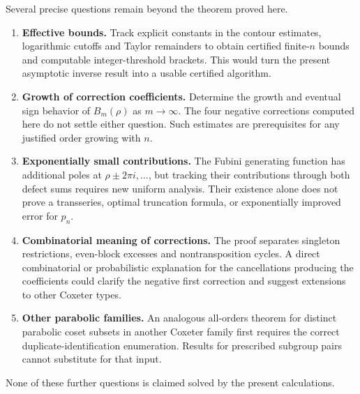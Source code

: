 \documentclass[11pt,letterpaper]{article}
\theoremstyle{remark}\newtheorem{remark}[theorem]{Remark}
\begin{document}
Several precise questions remain beyond the theorem proved here.
\begin{enumerate}[leftmargin=*,itemsep=4pt]
\item \textbf{Effective bounds.} Track explicit constants in the contour estimates, logarithmic cutoffs and Taylor remainders to obtain certified finite-$n$ bounds and computable integer-threshold brackets. This would turn the present asymptotic inverse result into a usable certified algorithm.
\item \textbf{Growth of correction coefficients.} Determine the growth and eventual sign behavior of $B_m(\rho)$ as $m\to\infty$. The four negative corrections computed here do not settle either question. Such estimates are prerequisites for any justified order growing with $n$.
\item \textbf{Exponentially small contributions.} The Fubini generating function has additional poles at $\rho\pm2\pi i,\ldots$, but tracking their contributions through both defect sums requires new uniform analysis. Their existence alone does not prove a transseries, optimal truncation formula, or exponentially improved error for $p_n$.
\item \textbf{Combinatorial meaning of corrections.} The proof separates singleton restrictions, even-block excesses and nontransposition cycles. A direct combinatorial or probabilistic explanation for the cancellations producing the coefficients could clarify the negative first correction and suggest extensions to other Coxeter types.
\item \textbf{Other parabolic families.} An analogous all-orders theorem for distinct parabolic coset subsets in another Coxeter family first requires the correct duplicate-identification enumeration. Results for prescribed subgroup pairs cannot substitute for that input.
\end{enumerate}
None of these further questions is claimed solved by the present calculations.

\appendix
\end{document}
